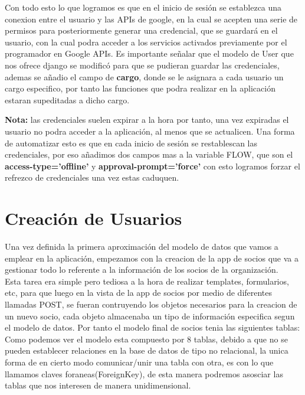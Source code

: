 \begin{itemize}
Con todo esto lo que logramos es que en el inicio de sesión se establezca una conexion entre el usuario y las APIs de google, en la cual se acepten una serie de permisos para posteriormente generar una credencial,
que se guardará en el usuario, con la cual podra acceder a los servicios activados previamente por el programador en Google APIs. Es importante señalar que el modelo de User que nos ofrece django se modificó para que
se pudieran guardar las credenciales, ademas se añadio el campo de \textbf{cargo}, donde se le asignara a cada usuario un cargo especifico, por tanto las funciones que podra realizar en la aplicación estaran supeditadas a dicho cargo.

\textbf{Nota:} las credenciales suelen expirar a la hora por tanto, una vez expiradas el usuario no podra acceder a la aplicación, al menos que se actualicen. Una forma de automatizar esto es que en cada inicio de sesión
se restablescan las credenciales, por eso añadimos dos campos mas a la variable FLOW, que son el \textbf{access-type='offline'} y \textbf{approval-prompt='force'} con esto logramos forzar el refrezco de
credenciales una vez estas caduquen.
\end{itemize}

\section{Creación de Usuarios}
\label{4:sec5}

Una vez definida la primera aproximación del modelo de datos que vamos a emplear en la aplicación, empezamos con la creacion de la app de socios que va a gestionar todo lo referente a la información de los socios de 
la organización.\\

Esta tarea era simple pero tediosa a la hora de realizar templates, formularios, etc, para que luego en la vista de la app de socios por medio de diferentes llamadas POST, se fueran contruyendo los objetos necesarios
para la creacion de un nuevo socio, cada objeto almacenaba un tipo de información especifica segun el modelo de datos. Por tanto el modelo final de socios tenia las siguientes tablas:\\



Como podemos ver el modelo esta compuesto por 8 tablas, debido a que no se pueden establecer relaciones en la base de datos de tipo no relacional, la unica forma de en cierto modo comunicar/unir una tabla con otra,
es con lo que llamamos claves foraneas(ForeignKey), de esta manera podremos asosciar las tablas que nos interesen de manera unidimensional.\\

